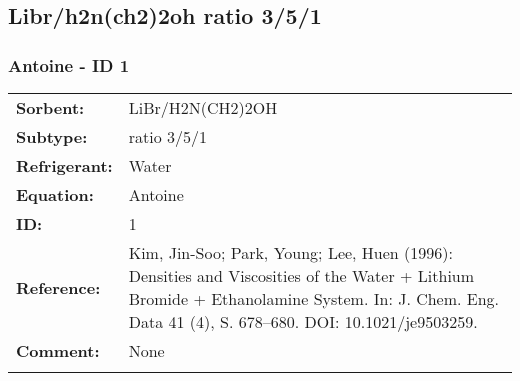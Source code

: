 \subsection{Libr/h2n(ch2)2oh  ratio 3/5/1}
%
\subsubsection{Antoine - ID 1}
%
\begin{tabular}[l]{|lp{11.5cm}|}
\hline
\addlinespace

\textbf{Sorbent:} & LiBr/H2N(CH2)2OH  \\
\textbf{Subtype:} & ratio 3/5/1 \\
\textbf{Refrigerant:} & Water  \\
\textbf{Equation:} & Antoine \\
\textbf{ID:} & 1 \\
\textbf{Reference:} & Kim, Jin-Soo; Park, Young; Lee, Huen (1996): Densities and Viscosities of the Water + Lithium Bromide + Ethanolamine System. In: J. Chem. Eng. Data 41 (4), S. 678–680. DOI: 10.1021/je9503259. \\
\textbf{Comment:} & None \\

\addlinespace
\hline
\end{tabular}
\newline

